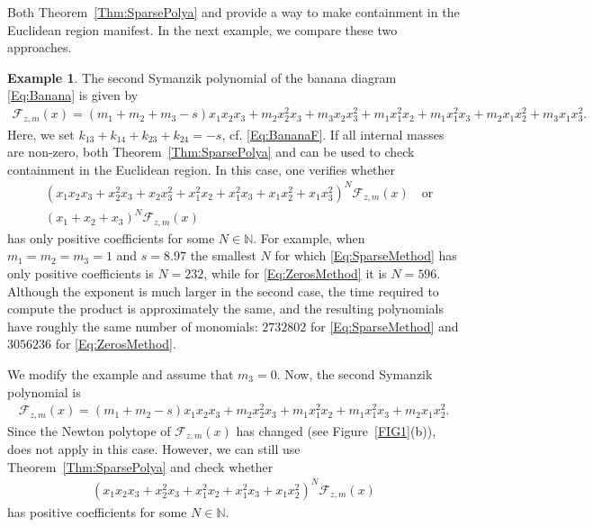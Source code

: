 \documentclass[a4paper,11pt]{amsart}
\theoremstyle{definition}
\newtheorem{example}[theorem]{Example}
\begin{document}
Both Theorem~\ref{Thm:SparsePolya} and \cite[Theorem 6.1]{SturmfelsTelek} provide a way to make containment in the Euclidean region manifest.
In the next example, we compare these two approaches.

\begin{example}
    The second Symanzik polynomial of the banana diagram \eqref{Eq:Banana} is given by
    \begin{align*}
         \mathcal{F}_{z,m}(x) =(m_1 + m_2 + m_3 - s) x_1x_2x_3 + m_2 x_2^2 x_3  + m_3 x_2 x_3^2 + m_1 x_1^2x_2 + m_1 x_1^2x_3  + m_2 x_1x_2^2 + m_3 x_1x_3^2.
    \end{align*}
   Here, we set  $k_{13} + k_{14} +k_{23} + k_{24} = -s$, cf. \eqref{Eq:BananaF}. If all internal masses are non-zero, both Theorem~\ref{Thm:SparsePolya} and \cite[Theorem 6.1]{SturmfelsTelek} can be used to check containment in the Euclidean region. In this case, one verifies whether
   \begin{align}
   \label{Eq:SparseMethod}
       &(x_1x_2x_3 + x_2^2 x_3  + x_2 x_3^2 + x_1^2x_2 + x_1^2x_3  + x_1x_2^2 + x_1x_3^2)^N \mathcal{F}_{z,m}(x) \quad \text{or} \\
       \label{Eq:ZerosMethod}
        &(x_1 + x_2 + x_3)^N \mathcal{F}_{z,m}(x)
   \end{align}
has only positive coefficients for some $N \in \mathbb{N}$.
For example, when $m_1 = m_2 = m_3 = 1$ and $s= 8.97$ the smallest $N$ for which \eqref{Eq:SparseMethod} has only positive coefficients is $N=232$, while for \eqref{Eq:ZerosMethod} it is $N=596$. Although the exponent is much larger in the second case, the time required to compute the product is approximately the same, and the resulting polynomials have roughly the same number of monomials: $2 732 802$ for \eqref{Eq:SparseMethod} and $3 056 236$ for \eqref{Eq:ZerosMethod}.

We modify the example and assume that $m_3 = 0$. Now, the second Symanzik polynomial is 
    \begin{align*}
         \mathcal{F}_{z,m}(x) =(m_1 + m_2 - s) x_1x_2x_3 + m_2 x_2^2 x_3   + m_1 x_1^2x_2 + m_1 x_1^2x_3  + m_2 x_1x_2^2.
    \end{align*}
    Since the Newton polytope of $ \mathcal{F}_{z,m}(x)$ has changed (see Figure~\ref{FIG1}(b)), \cite[Theorem 6.1]{SturmfelsTelek} does not apply in this case. However, we can still use Theorem~\ref{Thm:SparsePolya} and check whether
     \begin{align*}
       ( x_1x_2x_3 + x_2^2 x_3   +  x_1^2x_2 + x_1^2x_3  + x_1x_2^2)^N  \mathcal{F}_{z,m}(x) 
    \end{align*}
    has positive coefficients for some $N \in \mathbb{N}$.
\end{example}

\printbibliography

%
%
\end{document}
